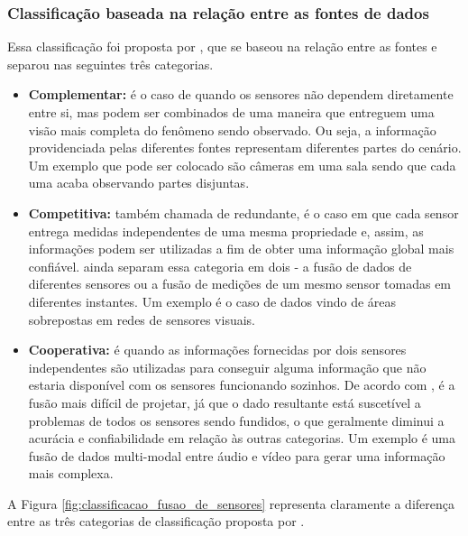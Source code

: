 \documentclass[acronym, symbols]{fei}
\begin{document}
			\subsubsection{Classificação baseada na relação entre as fontes de dados}
				Essa classificação foi proposta por \textcite{durrant1988sensor}, que se baseou na relação entre as fontes e separou nas seguintes três categorias.
				
				\begin{itemize}
					\item \textbf{Complementar:} é o caso de quando os sensores não dependem diretamente entre si, mas podem ser combinados de uma maneira que entreguem uma visão mais completa do fenômeno sendo observado. Ou seja, a informação providenciada pelas diferentes fontes representam diferentes partes do cenário. Um exemplo que pode ser colocado são câmeras em uma sala sendo que cada uma acaba observando partes disjuntas.
					
					\item \textbf{Competitiva:} também chamada de redundante, é o caso em que cada sensor entrega medidas independentes de uma mesma propriedade e, assim, as informações podem ser utilizadas a fim de obter uma informação global mais confiável. \textcite{visser1999organisation} ainda separam essa categoria em dois - a fusão de dados de diferentes sensores ou a fusão de medições de um mesmo sensor tomadas em diferentes instantes. Um exemplo é o caso de dados vindo de áreas sobrepostas em redes de sensores visuais.
					
					\item \textbf{Cooperativa:} é quando as informações fornecidas por dois sensores independentes são utilizadas para conseguir alguma informação que não estaria disponível com os sensores funcionando sozinhos. De acordo com \textcite{brooks1998multi}, é a fusão mais difícil de projetar, já que o dado resultante está suscetível a problemas de todos os sensores sendo fundidos, o que geralmente diminui a acurácia e confiabilidade em relação às outras categorias. Um exemplo é uma fusão de dados multi-modal entre áudio e vídeo para gerar uma informação mais complexa.
				\end{itemize}
			
				A Figura \ref{fig:classificacao_fusao_de_sensores} representa claramente a diferença entre as três categorias de classificação proposta por \textcite{durrant1988sensor}.
			
\end{document}

